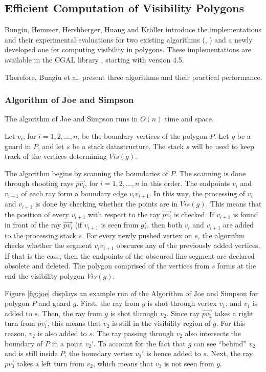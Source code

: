 \subsection{Efficient Computation of Visibility Polygons}
Bungiu, Hemmer, Hershberger, Huang and Kr\"oller  \cite{DBLP:journals/corr/BungiuHHHK14} introduce the implementations and their experimental evaluations for two existing algorithms (\cite{joe1987corrections}, \cite{asano1985efficient}) and a newly developed one for computing visibility in polygons. These implementations are available in the CGAL library \cite{cgal}, starting with version 4.5.


Therefore, Bungiu et al. present three algorithms and their practical performance.

\subsubsection{Algorithm of Joe and Simpson}
The algorithm of Joe and Simpson \cite{joe1987corrections} runs in $O(n)$ time and space. 

Let $v_i$, for $i = {1, 2, ..., n}$, be the boundary vertices of the polygon $P$. Let $g$ be a guard in $P$, and let $s$ be a stack datastructure. The stack $s$ will be used to keep track of the vertices determining $\mathit{Vis}(g)$. 

The algorithm begins by scanning the boundaries of $P$. The scanning is done through shooting rays $\vec{pv_i}$, for $i = {1, 2, ..., n}$ in this order. The endpoints $v_i$ and $v_{i + 1}$ of each ray form a boundary edge $\overline{v_iv_{i + 1}}$. In this way, the processing of $v_i$ and $v_{i + 1}$ is done by checking whether the points are in $\mathit{Vis}(g)$. This means that the position of every $v_{i + 1}$ with respect to the ray $\vec{pv_i}$ is checked. If $v_{i + 1}$ is found in front of the ray $\vec{pv_i}$ (if $v_{i + 1}$ is seen from $g$), then both $v_i$ and $v_{i + 1}$ are added to the processing stack $s$. For every newly pushed vertex on $s$, the algorithm checks whether the segment $\overline{v_iv_{i + 1}}$ obscures any of the previously added vertices. If that is the case, then the endpoints of the obscured line segment are declared obsolete and deleted. The polygon comprised of the vertices from $s$ forms at the end the visibility polygon $\mathit{Vis}(g)$.

Figure \ref{fig:joe} displays an example run of the Algorithm of Joe and Simpson \cite{joe1987corrections} for polygon $P$ and guard $g$. First, the ray from $g$ is shot through vertex $v_1$, and $v_1$ is added to $s$. Then, the ray from $g$ is shot through $v_2$. Since ray $\vec{pv_2}$ takes a right turn from $\vec{pv_1}$, this means that $v_2$ is still in the visibility region of $g$. For this reason, $v_2$ is also added to $s$. The ray passing through $v_2$ also intersects the boundary of $P$ in a point $v_2'$. To account for the fact that $g$ can see ``behind'' $v_2$ and is still inside $P$, the boundary vertex $v_2'$ is hence added to $s$. Next, the ray $\vec{pv_3}$ takes a left turn from $v_2$, which means that $v_3$ is not seen from $g$. 

